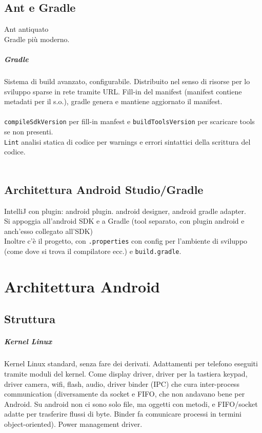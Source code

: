 \documentclass[10pt]{book}
\begin{document}
\section{Ant e Gradle}
Ant antiquato\\
Gradle più moderno.
\paragraph{Gradle} Sistema di build avanzato, configurabile. Distribuito nel senso di risorse per lo sviluppo sparse in rete tramite URL. Fill-in del manifest (manifest contiene metadati per il s.o.), gradle genera e mantiene aggiornato il manifest.\\
\\
\texttt{compileSdkVersion} per fill-in manfest e \texttt{buildToolsVersion} per scaricare tools se non presenti.\\
\texttt{Lint} analisi statica di codice per warnings e errori sintattici della scrittura del codice.\\\\
\section{Architettura Android Studio/Gradle}
IntelliJ con plugin: android plugin. android designer, android gradle adapter.\\
Si appoggia all'android SDK e a Gradle (tool separato, con plugin android e anch'esso collegato all'SDK)\\
Inoltre c'è il progetto, con \texttt{.properties} con config per l'ambiente di sviluppo (come dove si trova il compilatore ecc.) e \texttt{build.gradle}.

\chapter{Architettura Android}
\section{Struttura}
\paragraph{Kernel Linux} Kernel Linux standard, senza fare dei derivati. Adattamenti per telefono eseguiti tramite moduli del kernel. Come display driver, driver per la tastiera keypad, driver camera, wifi, flash, audio, driver binder (IPC) che cura inter-process communication (diversamente da socket e FIFO, che non andavano bene per Android. Su android non ci sono solo file, ma oggetti con metodi, e FIFO/socket adatte per trasferire flussi di byte. Binder fa comunicare processi in termini object-oriented). Power management driver.
\end{document}
